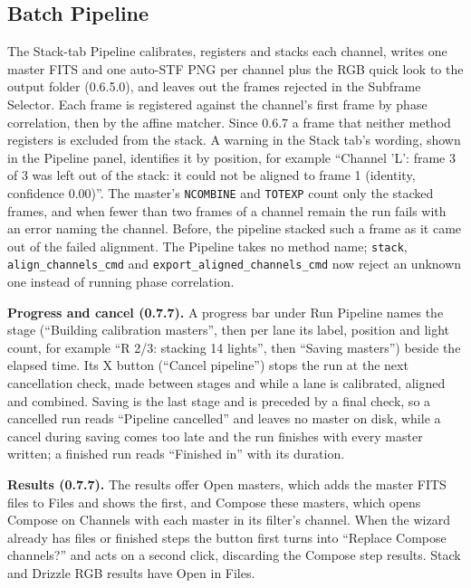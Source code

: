 \documentclass[11pt,a4paper]{article}
\newcommand{\code}[1]{\texttt{\small #1}}
\begin{document}
    \subsection{Batch Pipeline}

    The Stack-tab Pipeline calibrates, registers and stacks each channel, writes one master FITS and one auto-STF PNG per channel plus the RGB quick look to the output folder (0.6.5.0), and leaves out the frames rejected in the Subframe Selector. Each frame is registered against the channel's first frame by phase correlation, then by the affine matcher. Since 0.6.7 a frame that neither method registers is excluded from the stack. A warning in the Stack tab's wording, shown in the Pipeline panel, identifies it by position, for example ``Channel 'L': frame 3 of 3 was left out of the stack: it could not be aligned to frame 1 (identity, confidence 0.00)''. The master's \code{NCOMBINE} and \code{TOTEXP} count only the stacked frames, and when fewer than two frames of a channel remain the run fails with an error naming the channel. Before, the pipeline stacked such a frame as it came out of the failed alignment. The Pipeline takes no method name; \code{stack}, \code{align\_channels\_cmd} and \code{export\_aligned\_channels\_cmd} now reject an unknown one instead of running phase correlation.

    \textbf{Progress and cancel (0.7.7).} A progress bar under Run Pipeline names the stage (``Building calibration masters'', then per lane its label, position and light count, for example ``R 2/3: stacking 14 lights'', then ``Saving masters'') beside the elapsed time. Its X button (``Cancel pipeline'') stops the run at the next cancellation check, made between stages and while a lane is calibrated, aligned and combined. Saving is the last stage and is preceded by a final check, so a cancelled run reads ``Pipeline cancelled'' and leaves no master on disk, while a cancel during saving comes too late and the run finishes with every master written; a finished run reads ``Finished in'' with its duration.

    \textbf{Results (0.7.7).} The results offer Open masters, which adds the master FITS files to Files and shows the first, and Compose these masters, which opens Compose on Channels with each master in its filter's channel. When the wizard already has files or finished steps the button first turns into ``Replace Compose channels?'' and acts on a second click, discarding the Compose step results. Stack and Drizzle RGB results have Open in Files.
\end{document}
